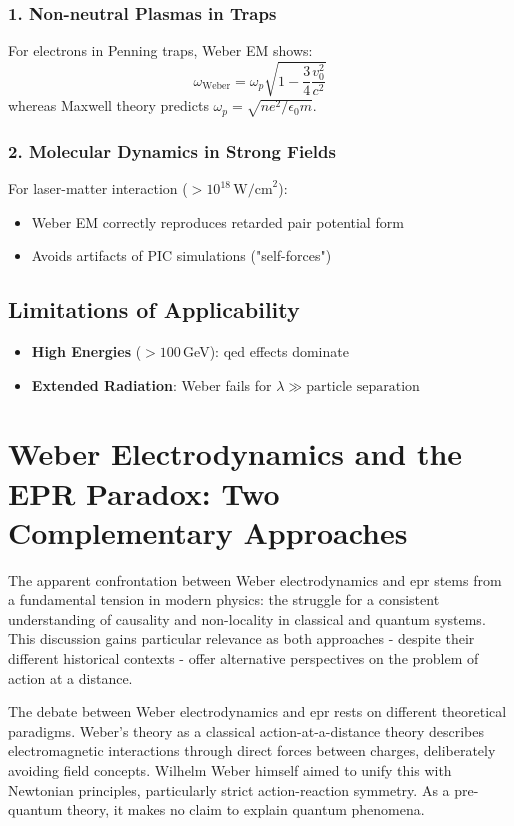 \subsubsection{1. Non-neutral Plasmas in Traps}
For electrons in Penning traps, Weber EM shows:
\begin{equation}
\omega_{\text{Weber}} = \omega_p\sqrt{1 - \frac{3}{4}\frac{v_0^2}{c^2}}
\end{equation}
whereas Maxwell theory predicts $\omega_p = \sqrt{ne^2/\epsilon_0 m}$.

\subsubsection{2. Molecular Dynamics in Strong Fields}
For laser-matter interaction ($>10^{18}\,\text{W/cm}^2$):
\begin{itemize}
\item Weber EM correctly reproduces retarded pair potential form
\item Avoids artifacts of PIC simulations ("self-forces")
\end{itemize}

\subsection{Limitations of Applicability}
\begin{itemize}
\item \textbf{High Energies} ($>100$\,GeV): \gls{qed} effects dominate
\item \textbf{Extended Radiation}: Weber fails for $\lambda \gg \text{particle separation}$
\end{itemize}

\section{Weber Electrodynamics and the EPR Paradox: Two Complementary Approaches}
The apparent confrontation between Weber electrodynamics and \gls{epr} stems from a fundamental tension in modern physics: the struggle for a consistent
understanding of causality and non-locality in classical and quantum systems. This discussion gains particular relevance as both approaches - despite their
different historical contexts - offer alternative perspectives on the problem of action at a distance.

The debate between Weber electrodynamics and \gls{epr} rests on different theoretical paradigms. Weber's theory as a classical action-at-a-distance theory describes
electromagnetic interactions through direct forces between charges, deliberately avoiding field concepts. Wilhelm Weber himself aimed to unify this with Newtonian
principles, particularly strict action-reaction symmetry. As a pre-quantum theory, it makes no claim to explain quantum phenomena.

